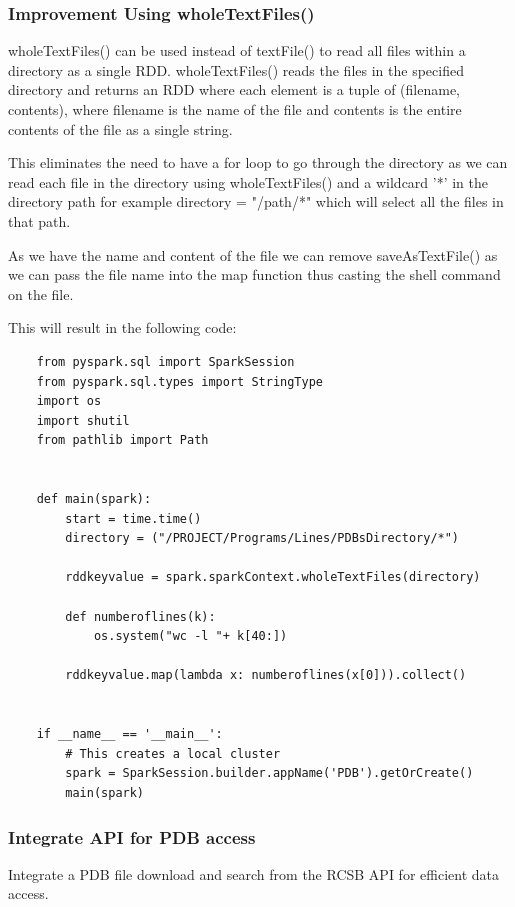 \documentclass[]{final_report}
\begin{document}
\clearpage

\subsubsection{Improvement Using wholeTextFiles()}

wholeTextFiles() can be used instead of textFile() to read all files within a directory as a single RDD. wholeTextFiles() reads the files in the specified directory and returns an RDD where each element is a tuple of (filename, contents), where filename is the name of the file and contents is the entire contents of the file as a single string.

This eliminates the need to have a for loop to go through the directory as we can read each file in the directory using wholeTextFiles() and a wildcard '*' in the directory path for example directory = "/path/*" which will select all the files in that path.

As we have the name and content of the file we can remove saveAsTextFile() as we can pass the file name into the map function thus casting the shell command on the file.

This will result in the following code:

\begin{lstlisting}
    from pyspark.sql import SparkSession
    from pyspark.sql.types import StringType
    import os
    import shutil
    from pathlib import Path


    def main(spark):
        start = time.time()
        directory = ("/PROJECT/Programs/Lines/PDBsDirectory/*")

        rddkeyvalue = spark.sparkContext.wholeTextFiles(directory)

        def numberoflines(k):
            os.system("wc -l "+ k[40:])
        
        rddkeyvalue.map(lambda x: numberoflines(x[0])).collect()


    if __name__ == '__main__':
        # This creates a local cluster
        spark = SparkSession.builder.appName('PDB').getOrCreate()
        main(spark)
\end{lstlisting}

\clearpage

\subsubsection{Integrate API for PDB access}
\begin{displayquote}
    Integrate a PDB file download and search from the RCSB API for efficient data access.
\end{displayquote}
\end{document}
